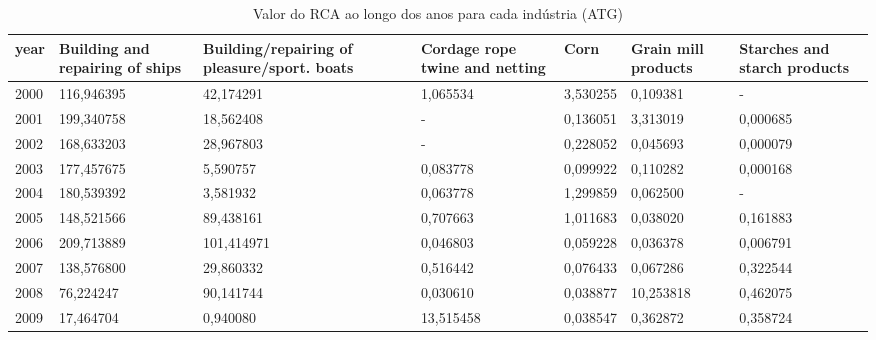\begin{table}
\centering
\caption{Valor do RCA ao longo dos anos para cada indústria (ATG)}
\begin{tabular}{p{1cm}p{2cm}p{2cm}p{2cm}p{2cm}p{2cm}p{2cm}}
\toprule
 year &  Building and repairing of ships &  Building/repairing of pleasure/sport. boats &  Cordage rope twine and netting &      Corn &  Grain mill products &  Starches and starch products \\
\midrule
 2000 &                       116,946395 &                                    42,174291 &                        1,065534 &  3,530255 &             0,109381 &                             - \\
 2001 &                       199,340758 &                                    18,562408 &                               - &  0,136051 &             3,313019 &                      0,000685 \\
 2002 &                       168,633203 &                                    28,967803 &                               - &  0,228052 &             0,045693 &                      0,000079 \\
 2003 &                       177,457675 &                                     5,590757 &                        0,083778 &  0,099922 &             0,110282 &                      0,000168 \\
 2004 &                       180,539392 &                                     3,581932 &                        0,063778 &  1,299859 &             0,062500 &                             - \\
 2005 &                       148,521566 &                                    89,438161 &                        0,707663 &  1,011683 &             0,038020 &                      0,161883 \\
 2006 &                       209,713889 &                                   101,414971 &                        0,046803 &  0,059228 &             0,036378 &                      0,006791 \\
 2007 &                       138,576800 &                                    29,860332 &                        0,516442 &  0,076433 &             0,067286 &                      0,322544 \\
 2008 &                        76,224247 &                                    90,141744 &                        0,030610 &  0,038877 &            10,253818 &                      0,462075 \\
 2009 &                        17,464704 &                                     0,940080 &                       13,515458 &  0,038547 &             0,362872 &                      0,358724 \\

\end{tabular}
\end{table}
